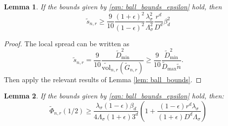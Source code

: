 \documentclass{article}
\newcommand{\vol}{\mathrm{vol}}
\newcommand{\1}{\mathbf{1}}
\newcommand{\wn}{\widetilde{n}}
\theoremstyle{aldenthm}
\newtheorem{lemma}{Lemma}
\begin{document}
\begin{lemma}
	\label{lem: local_spread_lower_bound}
	If the bounds given by \eqref{eqn: ball_bounds_epsilon} hold, then
	\begin{equation*}
	\widetilde{s}_{n,r} \geq \frac{9}{10} \frac{(1 + \epsilon)^2}{(1 - \epsilon)^2}\frac{\lambda_{\sigma}^2}{\Lambda_{\sigma}^2} \frac{r^d}{D^d} \beta_d^2
	\end{equation*}
\end{lemma}

\begin{proof}
	The local spread can be written as
	\begin{equation*}
	\widetilde{s}_{n,r} = \frac{9}{10} \frac{\widetilde{D}_{\min}^2}{\widetilde{\vol}_{n,r}(\widetilde{G}_{n,r})} \geq  \frac{9}{10} \frac{\widetilde{D}_{\min}^2}{\widetilde{D}_{\max} \wn}.
	\end{equation*}
	Then apply the relevant results of Lemma \ref{lem: ball_bounds}.
\end{proof}

\begin{lemma}
	\label{lem: non_convex_conductance_lower_bound}
	If the bounds given by \eqref{eqn: ball_bounds_epsilon} hold, then:
	\begin{equation*}
	\widetilde{\Phi}_{n,r}(1/2) \geq \frac{\lambda_{\sigma}(1 - \epsilon)\beta_d}{4\Lambda_{\sigma}(1 + \epsilon)3^d} \left(1 + \frac{(1 - \epsilon)r^d\lambda_{\sigma}}{(1 + \epsilon)D^d\Lambda_{\sigma}}\right)
	\end{equation*}
\end{lemma}
\end{document}
